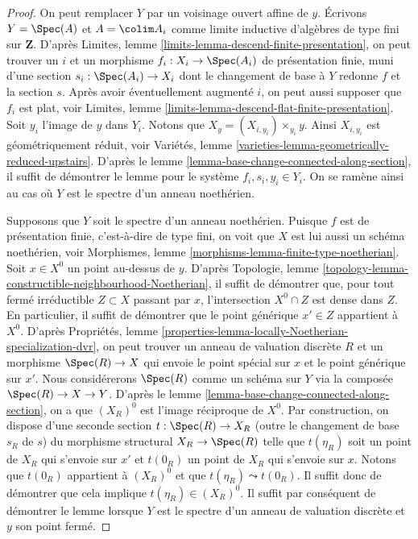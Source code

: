 \begin{proof}
On peut remplacer $Y$ par un voisinage ouvert affine de $y$.
Écrivons $Y = \Spec(A)$ et $A = \colim A_i$ comme limite
inductive d'algèbres de type fini sur $\mathbf{Z}$. D'après
Limites, lemme \ref{limits-lemma-descend-finite-presentation},
on peut trouver un $i$ et un morphisme $f_i : X_i \to \Spec(A_i)$ de
présentation finie, muni d'une section $s_i : \Spec(A_i) \to X_i$
dont le changement de base à $Y$ redonne $f$ et la section $s$.
Après avoir éventuellement augmenté $i$, on peut aussi supposer que $f_i$ est plat, voir
Limites, lemme \ref{limits-lemma-descend-flat-finite-presentation}.
Soit $y_i$ l'image de $y$ dans $Y_i$. Notons que
$X_y = (X_{i, y_i}) \times_{y_i} y$. Ainsi $X_{i, y_i}$ est géométriquement
réduit, voir
Variétés, lemme \ref{varieties-lemma-geometrically-reduced-upstairs}.
D'après le
lemme \ref{lemma-base-change-connected-along-section},
il suffit de démontrer le lemme pour le système $f_i, s_i, y_i \in Y_i$.
On se ramène ainsi au cas où $Y$ est le spectre d'un anneau noethérien.

\medskip\noindent
Supposons que $Y$ soit le spectre d'un anneau noethérien.
Puisque $f$ est de présentation finie,
c'est-à-dire de type fini, on voit que $X$ est lui aussi un schéma noethérien, voir
Morphismes, lemme \ref{morphisms-lemma-finite-type-noetherian}.
Soit $x \in X^0$ un point au-dessus de $y$. D'après
Topologie, lemme \ref{topology-lemma-constructible-neighbourhood-Noetherian},
il suffit de démontrer que, pour tout fermé irréductible $Z \subset X$
passant par $x$, l'intersection $X^0 \cap Z$ est dense dans $Z$.
En particulier, il suffit de démontrer que le point générique $x' \in Z$
appartient à $X^0$. D'après
Propriétés, lemme \ref{properties-lemma-locally-Noetherian-specialization-dvr},
on peut trouver un anneau de valuation discrète $R$ et un morphisme
$\Spec(R) \to X$ qui envoie le point spécial sur $x$ et
le point générique sur $x'$. Nous considérerons $\Spec(R)$
comme un schéma sur $Y$ via la composée $\Spec(R) \to X \to Y$. D'après le
lemme \ref{lemma-base-change-connected-along-section},
on a que $(X_R)^0$ est l'image réciproque de $X^0$.
Par construction, on dispose d'une seconde section $t : \Spec(R) \to X_R$
(outre le changement de base $s_R$ de $s$)
du morphisme structural $X_R \to \Spec(R)$ telle que
$t(\eta_R)$ soit un point de $X_R$ qui s'envoie sur $x'$ et
$t(0_R)$ un point de $X_R$ qui s'envoie sur $x$. Notons que
$t(0_R)$ appartient à $(X_R)^0$ et que $t(\eta_R) \leadsto t(0_R)$.
Il suffit donc de démontrer que cela implique $t(\eta_R) \in (X_R)^0$.
Il suffit par conséquent de démontrer le lemme lorsque $Y$
est le spectre d'un anneau de valuation discrète et $y$ son point fermé.


\end{proof}
